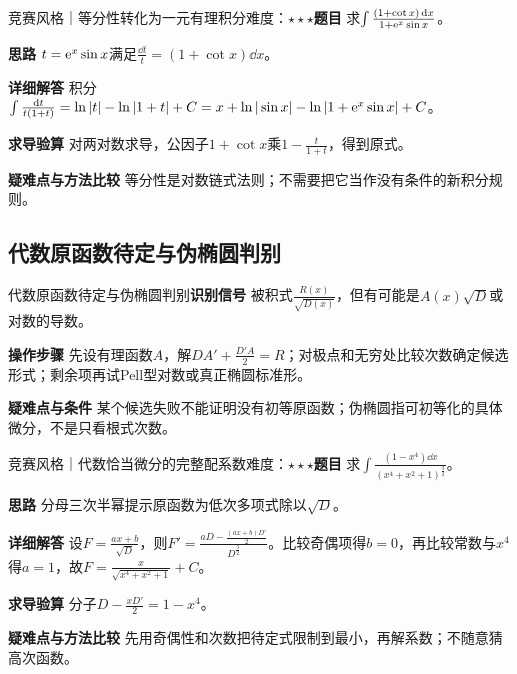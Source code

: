 \begin{example}{竞赛风格｜等分性转化为一元有理积分}{难度：$\star\star\star$}\label{ic:ex:indefinite_algebra_complete:equalpartlock}\textbf{题目} 求$\int\frac{(1+\cot x)\mathop{}\!\mathrm{d} x}{1+\mathrm{e}^x\sin x}$。\par \textbf{思路} $t=\mathrm{e}^x\sin x$满足$\frac{\dd t}{t}=(1+\cot x)\dd x$。\par \textbf{详细解答} 积分$\int\frac{\mathop{}\!\mathrm{d} t}{t(1+t)}=\ln|t|-\ln|1+t|+C=x+\ln|\sin x|-\ln|1+\mathrm{e}^x\sin x|+C$。\par \textbf{求导验算} 对两对数求导，公因子$1+\cot x$乘$1-\frac{t}{1+t}$，得到原式。\par \textbf{疑难点与方法比较} 等分性是对数链式法则；不需要把它当作没有条件的新积分规则。\end{example}

\subsection{代数原函数待定与伪椭圆判别}\label{ic:indefinite_algebra_complete:exactalg}\begin{method}{代数原函数待定与伪椭圆判别}\textbf{识别信号} 被积式$\frac{R(x)}{\sqrt{D(x)}}$，但有可能是$A(x)\sqrt D$或对数的导数。\par \textbf{操作步骤} 先设有理函数$A$，解$DA'+\frac{D'A}{2}=R$；对极点和无穷处比较次数确定候选形式；剩余项再试Pell型对数或真正椭圆标准形。\par \textbf{疑难点与条件} 某个候选失败不能证明没有初等原函数；伪椭圆指可初等化的具体微分，不是只看根式次数。\end{method}

\begin{example}{竞赛风格｜代数恰当微分的完整配系数}{难度：$\star\star\star$}\label{ic:ex:indefinite_algebra_complete:algebraansatz}\textbf{题目} 求$\int\frac{(1-x^4)\dd x}{(x^4+x^2+1)^{\frac{3}{2}}}$。\par \textbf{思路} 分母三次半幂提示原函数为低次多项式除以$\sqrt D$。\par \textbf{详细解答} 设$F=\frac{ax+b}{\sqrt D}$，则$F'=\frac{aD-\frac{(ax+b)D'}{2}}{D^{\frac{3}{2}}}$。比较奇偶项得$b=0$，再比较常数与$x^4$得$a=1$，故$F=\frac{x}{\sqrt{x^4+x^2+1}}+C$。\par \textbf{求导验算} 分子$D-\frac{xD'}{2}=1-x^4$。\par \textbf{疑难点与方法比较} 先用奇偶性和次数把待定式限制到最小，再解系数；不随意猜高次函数。\end{example}

